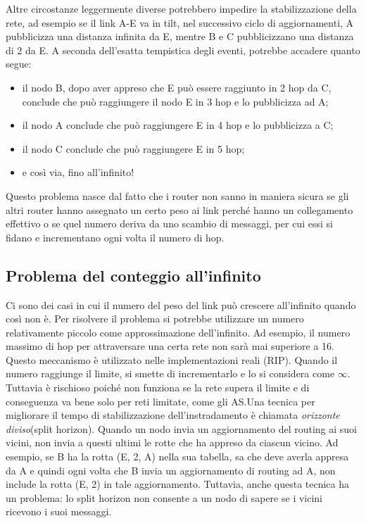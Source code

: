 Altre circostanze leggermente diverse potrebbero impedire la stabilizzazione della rete, ad esempio se il link A-E va in tilt, nel successivo ciclo di aggiornamenti, A pubblicizza una distanza infinita da E, mentre B e C pubblicizzano una distanza di 2 da E. A seconda dell’esatta tempistica degli eventi, potrebbe accadere quanto segue:
\begin{itemize}
  \item il nodo B, dopo aver appreso che E può essere raggiunto in 2 hop da C, conclude che può raggiungere il nodo E in 3 hop e lo pubblicizza ad A;
  \item il nodo A conclude che può raggiungere E in 4 hop e lo pubblicizza a C; 
  \item il nodo C conclude che può raggiungere E in 5 hop;
  \item e così via, fino all’infinito!
\end{itemize}
Questo problema nasce dal fatto che i router non sanno in maniera sicura se gli altri router hanno assegnato un certo peso ai link perché hanno un collegamento effettivo o se quel numero deriva da uno scambio di messaggi, per cui essi si fidano e incrementano ogni volta il numero di hop.
\subsection{Problema del conteggio all'infinito}
Ci sono dei casi in cui il numero del peso del link può crescere all’infinito quando così non è. Per risolvere il problema si potrebbe utilizzare un numero relativamente piccolo come approssimazione dell’infinito. Ad esempio, il numero massimo di hop per attraversare una certa rete non sarà mai superiore a 16. Questo meccanismo è utilizzato nelle implementazioni reali (RIP). Quando il numero raggiunge il limite, si smette di incrementarlo e lo si considera come $\infty$. Tuttavia è rischioso poiché non funziona se la rete supera il limite e di conseguenza va bene solo per reti limitate, come gli AS.Una tecnica per migliorare il tempo di stabilizzazione dell’instradamento è chiamata \textit{orizzonte diviso}(split horizon). Quando un nodo invia un aggiornamento del routing ai suoi vicini, non invia a questi ultimi le rotte che ha appreso da ciascun vicino. Ad esempio, se B ha la rotta (E, 2, A) nella sua tabella, sa che deve averla appresa da A e quindi ogni volta che B invia un aggiornamento di routing ad A, non include la rotta (E, 2) in tale aggiornamento. Tuttavia, anche questa tecnica ha un problema: lo split horizon non consente a un nodo di sapere se i vicini ricevono i suoi messaggi. \\

